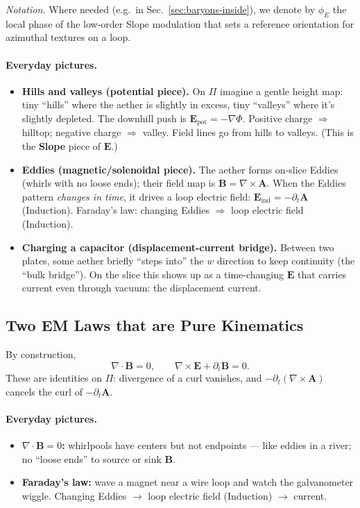 \noindent\emph{Notation.} Where needed (e.g.\ in Sec.~\ref{sec:baryons-inside}), we denote by $\phi_E$ the local phase of the low-order Slope modulation that sets a reference orientation for azimuthal textures on a loop.

\paragraph{Everyday pictures.}
\begin{itemize}
  \item \textbf{Hills and valleys (potential piece).} On $\Pi$ imagine a gentle height map: tiny ``hills'' where the aether is slightly in excess, tiny ``valleys'' where it's slightly depleted. The downhill push is $\mathbf E_{\text{pot}}=-\nabla\Phi$. Positive charge $\Rightarrow$ hilltop; negative charge $\Rightarrow$ valley. Field lines go from hills to valleys. (This is the \textbf{Slope} piece of $\mathbf E$.)
  \item \textbf{Eddies (magnetic/solenoidal piece).} The aether forms on-slice Eddies (whirls with no loose ends); their field map is $\mathbf B=\nabla\times\mathbf A$. When the Eddies pattern \emph{changes in time}, it drives a loop electric field: $\mathbf E_{\text{ind}}=-\partial_t\mathbf A$ (Induction). Faraday's law: changing Eddies $\Rightarrow$ loop electric field (Induction).
  \item \textbf{Charging a capacitor (displacement-current bridge).} Between two plates, some aether briefly ``steps into'' the $w$ direction to keep continuity (the ``bulk bridge''). On the slice this shows up as a time-changing $\mathbf E$ that carries current even through vacuum: the displacement current.
\end{itemize}

\subsection{Two EM Laws that are Pure Kinematics}
By construction,
\begin{equation}
\nabla\!\cdot\!\mathbf B = 0,
\qquad
\nabla\times\mathbf E + \partial_t \mathbf B = 0.
\label{eq:homogeneous}
\end{equation}
These are identities on $\Pi$: divergence of a curl vanishes, and $-\partial_t(\nabla\times\mathbf A)$ cancels the curl of $-\partial_t\mathbf A$.

\paragraph{Everyday pictures.}
\begin{itemize}
  \item \textbf{$\nabla\!\cdot\!\mathbf B=0$:} whirlpools have centers but not endpoints --- like eddies in a river; no ``loose ends'' to source or sink $\mathbf B$.
  \item \textbf{Faraday's law:} wave a magnet near a wire loop and watch the galvanometer wiggle. Changing Eddies $\to$ loop electric field (Induction) $\to$ current.
\end{itemize}

